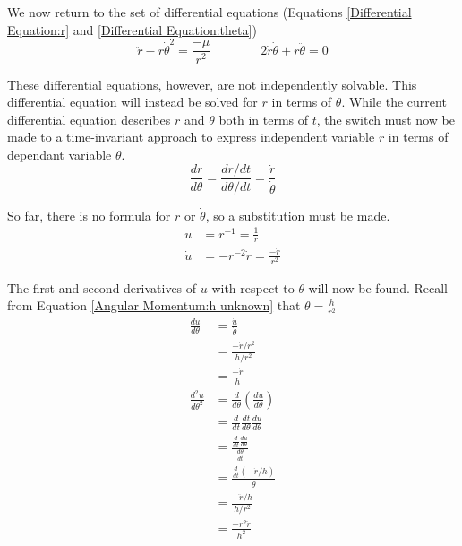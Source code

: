 \documentclass[../basicOrbitalDynamics.tex]{subfiles}
\begin{document}
We now return to the set of differential equations (Equations \eqref{Differential Equation:r} and \eqref{Differential Equation:theta})
$$\ddot{r}-r\dot{\theta}^2=\frac{-\mu}{r^2} \qquad\qquad 2\dot{r}\dot{\theta}+r\ddot{\theta}=0$$

These differential equations, however, are not independently solvable. This differential equation will instead be solved for $r$ in terms of $\theta$. While the current differential equation describes $r$ and $\theta$ both in terms of $t$, the switch must now be made to a time-invariant approach to express independent variable $r$ in terms of dependant variable $\theta$.
$$\frac{dr}{d\theta{}}=\frac{dr/dt}{d\theta{}/dt}=\frac{\dot{r}}{\dot{\theta}}$$

So far, there is no formula for $\dot{r}$ or $\dot{\theta}$, so a substitution must be made.
\begin{align*}
    u       & =r^{-1}=\frac{1}{r}                  \\
    \dot{u} & =-r^{-2}\dot{r}=\frac{-\dot{r}}{r^2}
\end{align*}

The first and second derivatives of $u$ with respect to $\theta$ will now be found. Recall from Equation \eqref{Angular Momentum:h unknown} that $\dot{\theta}=\frac{h}{r^2}$
\begin{align*}
    \frac{du}{d\theta}     & =\frac{\dot{u}}{\dot{\theta}}                              \\
                           & =\frac{-\dot{r}/r^2}{h/r^2}                                \\
                           & =\frac{-\dot{r}}{h}                                        \\
    \frac{d^2u}{d\theta^2} & =\frac{d}{d\theta}(\frac{du}{d\theta})                     \\
                           & =\frac{d}{dt}\frac{dt}{d\theta}\frac{du}{d\theta}          \\
                           & =\frac{\frac{d}{dt}\frac{du}{d\theta}}{\frac{d\theta}{dt}} \\
                           & =\frac{\frac{d}{dt}(-\dot{r}/h)}{\dot{\theta}}             \\
                           & =\frac{-\ddot{r}/h}{h/r^2}                                 \\
                           & =\frac{-r^2\ddot{r}}{h^2}
\end{align*}
\end{document}

